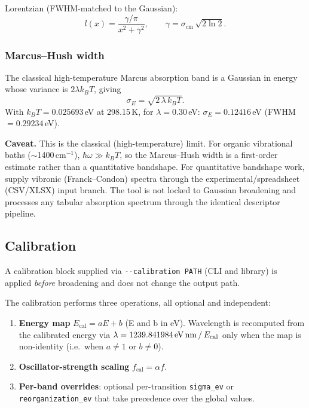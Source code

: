 \documentclass[11pt,a4paper]{article}
\begin{document}
Lorentzian (FWHM-matched to the Gaussian):
\begin{equation}
l(x) = \frac{\gamma/\pi}{x^2 + \gamma^2},\qquad
\gamma = \sigma_{\text{cm}}\,\sqrt{2\ln 2}.
\end{equation}

\subsubsection*{Marcus--Hush width}

The classical high-temperature Marcus absorption band is a Gaussian in
energy whose variance is \(2\lambda k_B T\), giving
\begin{equation}
\sigma_E = \sqrt{2\,\lambda\,k_B T}.
\end{equation}
With \(k_B T = 0.025693\)\,eV at 298.15\,K, for \(\lambda = 0.30\)\,eV:
\(\sigma_E = 0.12416\)\,eV (FWHM \(= 0.29234\)\,eV).

\medskip
\noindent\textbf{Caveat.} This is the classical (high-temperature) limit.
For organic vibrational baths (\(\sim\)1400\,cm\(^{-1}\)),
\(\hbar\omega \gg k_B T\), so the Marcus--Hush width is a first-order
estimate rather than a quantitative bandshape. For quantitative bandshape
work, supply vibronic (Franck--Condon) spectra through the
experimental/spreadsheet (CSV/XLSX) input branch. The tool is not locked
to Gaussian broadening and processes any tabular absorption spectrum
through the identical descriptor pipeline.

\subsection{Calibration}
\label{sec:calibration}

A calibration block supplied via \texttt{-{}-calibration PATH} (CLI and
library) is applied \emph{before} broadening and does not change the
output path.

The calibration performs three operations, all optional and independent:
\begin{enumerate}
  \item \textbf{Energy map} \(E_{\text{cal}} = aE + b\) (E and b in eV).
        Wavelength is recomputed from the calibrated energy via
        \(\lambda = 1239.841984\,\text{eV\,nm}\,/\,E_{\text{cal}}\) only
        when the map is non-identity (i.e.\ when \(a \ne 1\) or
        \(b \ne 0\)).
  \item \textbf{Oscillator-strength scaling}
        \(f_{\text{cal}} = \alpha f\).
  \item \textbf{Per-band overrides}: optional per-transition
        \texttt{sigma\_ev} or \texttt{reorganization\_ev} that take
        precedence over the global values.
\end{enumerate}
\end{document}
